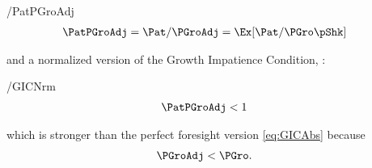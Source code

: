 \documentclass[BufferStockTheory]{subfiles}
\begin{document}
\begin{verbatimwrite}{\EqDir/PatPGroAdj}
  \begin{align}
    \PatPGroAdj  & = \Pat/\PGroAdj = \Ex[\Pat/\PGro\pShk]  \label{eq:GPFNrm} 
  \end{align}
\end{verbatimwrite}

\begin{comment}
and the proof of Theorem~\ref{thm:balance} below yields the conclusion that
\begin{align*}
  \lim_{\mRat_{t} \rightarrow \infty} \Ex_{t}[\mRat_{t+1}/\mRat_{t}]  & = \PatPGroAdj,
\end{align*}

which implies that if we wish to prevent $\mRat$ from heading to infinity (that is, if we want $\mRat$ to be expected to fall for some large enough value of $m$) we must impose a modified version of the Growth Impatience Condition \eqref{eq:GICAbs}; we call the `Normalized Growth Impatience Condition' (\GICNrm) the requirement that the Normalized Growth Patience Factor~\eqref{eq:GPFNrm} must be less than 1:\footnote{Under our assumption that $\CRRA>1$, equation \eqref{eq:GICNrm} is a bit easier to satisfy than the similar condition imposed by Deaton~\citeyearpar{deatonLiqConstr}: $\left(\Ex[\pShk^{-\CRRA}]\right)^{1/\CRRA} \PatPGro < 1$ to guarantee that his problem defined a contraction mapping.}
\end{comment}
and a normalized version of the Growth Impatience Condition, {\GICNrm}:
\begin{verbatimwrite}{\EqDir/GICNrm}
  \begin{align}
    \PatPGroAdj  & < 1 \label{eq:GICNrm}
  \end{align}\end{verbatimwrite}

which is stronger than the perfect foresight version \eqref{eq:GICAbs} because
\begin{align}
  \PGroAdj & < \PGro \label{eq:PGroAdjLTPGro}.
\end{align}

\hypertarget{Autarky-Value}{}
\end{document}
